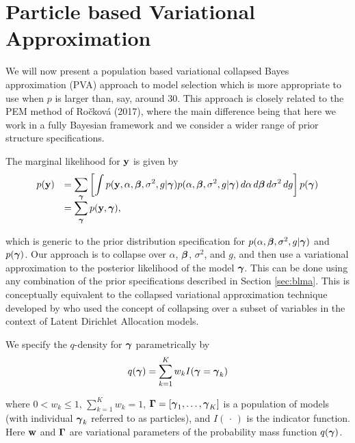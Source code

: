 \section{Particle based Variational Approximation}
\label{sec:pb-pva}

We will now present a population based variational collapsed Bayes approximation (PVA) approach to model 
selection which is more appropriate to use when $p$ is larger than, say, around $30$. This approach is closely related to the PEM  method of Ro\v{c}kov\'{a} (2017), 
where the main difference being that here we work in a fully Bayesian framework
and we consider a wider range of prior structure specifications.

The marginal likelihood for ${\bf y}$ is given by
$$
\begin{array}{rl}
\displaystyle p({\bf y}) 
& \displaystyle = \sum_{{\boldsymbol \gamma}} \left[ \int p({\bf y},\alpha,{\boldsymbol \beta},\sigma^2,g|{\boldsymbol \gamma}) p(\alpha,{\boldsymbol \beta},\sigma^2,g|{\boldsymbol \gamma}) \, d\alpha \, d{\boldsymbol \beta} \, d\sigma^2 \, dg\right] p({\boldsymbol \gamma}) 
\\
& \displaystyle = \sum_{{\boldsymbol \gamma}} p({\bf y},{\boldsymbol \gamma}),
\end{array} 
$$

\noindent which is generic to the  prior distribution specification for 
$p(\alpha,{\boldsymbol \beta},\sigma^2,g|{\boldsymbol \gamma})$ and $p({\boldsymbol \gamma})$. 
Our approach is to collapse over $\alpha$, ${\boldsymbol \beta}$, $\sigma^2$, and $g$,
and then use a variational approximation to the posterior likelihood of the model ${\boldsymbol \gamma}$.
This can be done using any combination of the prior specifications
described in Section \ref{sec:blma}.
This is conceptually equivalent to the collapsed
variational approximation technique developed by \cite{Teh2006}  
who used the concept of collapsing over a subset of variables in the
context of  Latent Dirichlet Allocation models.

We specify the $q$-density for ${\boldsymbol \gamma}$ parametrically by
\begin{equation}\label{eq:qgamma} 
q({\boldsymbol \gamma}) = \sum_{k=1}^K w_k I({\boldsymbol \gamma} = {\boldsymbol \gamma}_k)
\end{equation} 

\noindent 
where $0 < w_k \le 1$, $\sum_{k=1}^K w_k = 1$, ${\boldsymbol \Gamma} = [{\boldsymbol \gamma}_1,\ldots,{\boldsymbol \gamma}_K]$ is a population of models 
(with
individual ${\boldsymbol \gamma}_k$ referred to as particles), and $I(\,\cdot\,)$
is the indicator function. Here
${\bf w}$ and ${\boldsymbol \Gamma}$ are variational parameters of the probability mass function 
$q({\boldsymbol \gamma})$.

